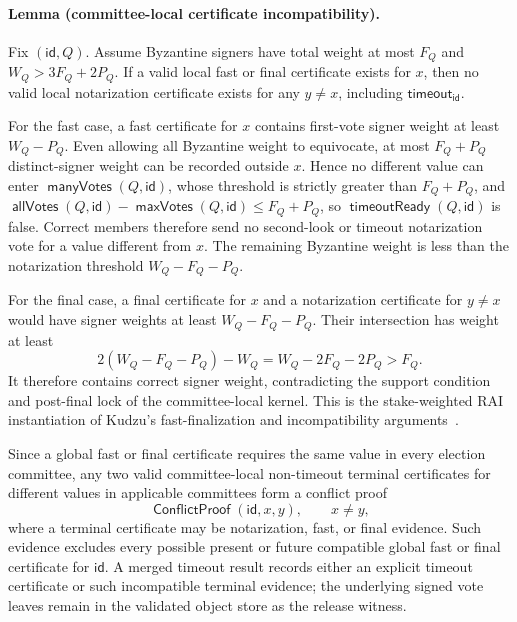 \documentclass[sigplan,twocolumn,review,anonymous]{acmart}
\newcommand{\func}[1]{\operatorname{\mathsf{#1}}}
\newcommand{\ConflictProof}{\func{ConflictProof}}
\newcommand{\manyVotes}{\func{manyVotes}}
\newcommand{\allVotes}{\func{allVotes}}
\newcommand{\maxVotes}{\func{maxVotes}}
\newcommand{\id}{\mathsf{id}}
\newcommand{\timeoutVal}{\mathsf{timeout}}
\newcommand{\timeoutReady}{\func{timeoutReady}}
\begin{document}
\paragraph{Lemma (committee-local certificate incompatibility).}
Fix \((\id,Q)\).  Assume Byzantine signers have total weight at most \(F_Q\) and
\(W_Q>3F_Q+2P_Q\).  If a valid local fast or final certificate exists for \(x\), then no valid local
notarization certificate exists for any \(y\neq x\), including \(\timeoutVal_\id\).

For the fast case, a fast certificate for \(x\) contains first-vote signer weight at least
\(W_Q-P_Q\).  Even allowing all Byzantine weight to equivocate, at most \(F_Q+P_Q\) distinct-signer
weight can be recorded outside \(x\).  Hence no different value can enter \(\manyVotes(Q,\id)\), whose
threshold is strictly greater than \(F_Q+P_Q\), and
\(\allVotes(Q,\id)-\maxVotes(Q,\id)\le F_Q+P_Q\), so \(\timeoutReady(Q,\id)\) is false.  Correct
members therefore send no second-look or timeout notarization vote for a value different from \(x\).
The remaining Byzantine weight is less than the notarization threshold \(W_Q-F_Q-P_Q\).

For the final case, a final certificate for \(x\) and a notarization certificate for \(y\neq x\) would
have signer weights at least \(W_Q-F_Q-P_Q\).  Their intersection has weight at least
\[
2(W_Q-F_Q-P_Q)-W_Q=W_Q-2F_Q-2P_Q>F_Q.
\]
It therefore contains correct signer weight, contradicting the support condition and post-final lock of
the committee-local kernel.  This is the stake-weighted RAI instantiation of Kudzu's fast-finalization
and incompatibility arguments~\cite[Lemmas~5.4--5.7]{shoup2025kudzu}.

Since a global fast or final certificate requires the same value in every election committee, any two
valid committee-local non-timeout terminal certificates for different values in applicable committees
form a conflict proof
\[
\ConflictProof(\id,x,y),\qquad x\neq y,
\]
where a terminal certificate may be notarization, fast, or final evidence.  Such evidence excludes every
possible present or future compatible global fast or final certificate for \(\id\).  A merged timeout
result records either an explicit timeout certificate or such incompatible terminal evidence; the
underlying signed vote leaves remain in the validated object store as the release witness.
\end{document}
